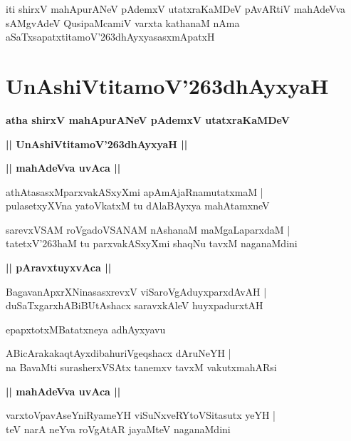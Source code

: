 \documentclass[twoside,12pt,openright]{book}
\def\S{\char'263}
\newcounter{shloka}[chapter]
\def\uvaca#1{\centerline{{\large\textbf{#1}}}}
\begin{document}
\begin{center}
iti shirxV mahApurANeV pAdemxV utatxraKaMDeV pAvARtiV mahAdeVva sAMgvAdeV QusipaMcamiV varxta 
kathanaM nAma aSaTxsapatxtitamoV\S dhAyxyasasxmApatxH 
\end{center}

\chapter{UnAshiVtitamoV\S dhAyxyaH}

\begin{center}
{\LARGE\bfseries atha shirxV mahApurANeV pAdemxV utatxraKaMDeV}
\end{center}

\begin{center}
{\LARGE\bfseries || UnAshiVtitamoV\S dhAyxyaH || }
\end{center}

\uvaca{|| mahAdeVva uvAca ||}

\begin{shloka}%
athAtasasxMparxvakASxyXmi apAmAjaRnamutatxmaM |\\
pulasetxyXVna yatoVkatxM tu dAlaBAyxya mahAtamxneV 
\end{shloka}

\begin{shloka}%
sarevxVSAM roVgadoVSANAM nAshanaM maMgaLaparxdaM |\\
tatetxV\S haM tu parxvakASxyXmi shaqNu tavxM naganaMdini
\end{shloka}

\uvaca{|| pAravxtuyxvAca ||}

\begin{shloka}%
BagavanApxrXNinasasxrevxV viSaroVgAduyxparxdAvAH |\\
duSaTxgarxhABiBUtAshacx saravxkAleV huyxpadurxtAH 
\end{shloka}

\begin{center}
epapxtotxMBatatxneya adhAyxyavu
\end{center}

\begin{shloka}%
ABicArakakaqtAyxdibahuriVgeqshacx dAruNeYH |\\
na BavaMti surasherxVSAtx tanemxv tavxM vakutxmahARsi 
\end{shloka}

\uvaca{|| mahAdeVva uvAca ||}

\begin{shloka}%
varxtoVpavAseYniRyameYH viSuNxveRYtoVSitasutx yeYH |\\
teV narA neYva roVgAtAR jayaMteV naganaMdini
\end{shloka}
\end{document}
